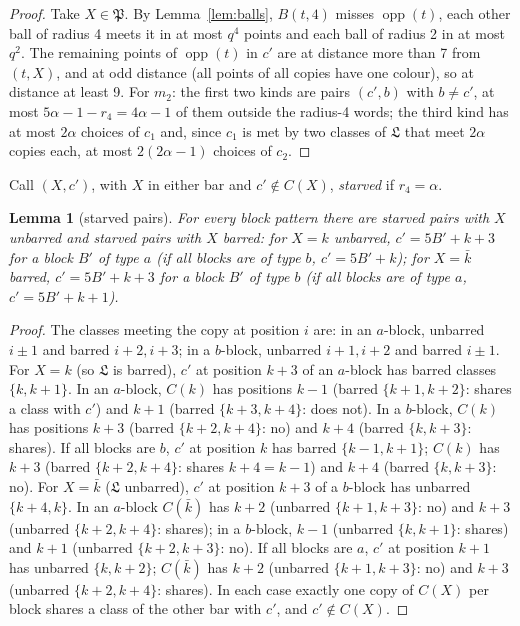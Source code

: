 \documentclass[11pt]{amsart}
\newtheorem{lemma}[theorem]{Lemma}
\theoremstyle{definition}
\theoremstyle{remark}
\numberwithin{equation}{section}
\newcommand{\opp}{\operatorname{opp}}
\begin{document}
\begin{proof}
Take $X\in\mathfrak P$. By Lemma~\ref{lem:balls}, $B(t,4)$ misses $\opp(t)$, each other ball of radius 4 meets it in at most
$q^4$ points and each ball of radius 2 in at most $q^2$. The remaining points of $\opp(t)$ in $c'$ are at distance more than 7
from $(t,X)$, and at odd distance (all points of all copies have one colour), so at distance at least 9. For $m_2$: the first
two kinds are pairs $(c',b)$ with $b\ne c'$, at most $5\alpha-1-r_4=4\alpha-1$ of them outside the radius-4 words; the third
kind has at most $2\alpha$ choices of $c_1$ and, since $c_1$ is met by two classes of $\mathfrak L$ that meet $2\alpha$ copies
each, at most $2(2\alpha-1)$ choices of $c_2$.
\end{proof}

Call $(X,c')$, with $X$ in either bar and $c'\notin C(X)$, \emph{starved} if $r_4=\alpha$.

\begin{lemma}[starved pairs]\label{lem:starved}
For every block pattern there are starved pairs with $X$ unbarred and starved pairs with $X$ barred: for $X=k$ unbarred,
$c'=5B'+k+3$ for a block $B'$ of type $a$ (if all blocks are of type $b$, $c'=5B'+k$); for $X=\bar k$ barred, $c'=5B'+k+3$ for
a block $B'$ of type $b$ (if all blocks are of type $a$, $c'=5B'+k+1$).
\end{lemma}

\begin{proof}
The classes meeting the copy at position $i$ are: in an $a$-block, unbarred $i\pm1$ and barred $i+2,i+3$; in a $b$-block,
unbarred $i+1,i+2$ and barred $i\pm1$. For $X=k$ (so $\mathfrak L$ is barred), $c'$ at position $k+3$ of an $a$-block has
barred classes $\{k,k+1\}$. In an $a$-block, $C(k)$ has positions $k-1$ (barred $\{k+1,k+2\}$: shares a class with $c'$) and
$k+1$ (barred $\{k+3,k+4\}$: does not). In a $b$-block, $C(k)$ has positions $k+3$ (barred $\{k+2,k+4\}$: no) and $k+4$
(barred $\{k,k+3\}$: shares). If all blocks are $b$, $c'$ at position $k$ has barred $\{k-1,k+1\}$; $C(k)$ has $k+3$ (barred
$\{k+2,k+4\}$: shares $k+4=k-1$) and $k+4$ (barred $\{k,k+3\}$: no). For $X=\bar k$ ($\mathfrak L$ unbarred), $c'$ at position
$k+3$ of a $b$-block has unbarred $\{k+4,k\}$. In an $a$-block $C(\bar k)$ has $k+2$ (unbarred $\{k+1,k+3\}$: no) and $k+3$
(unbarred $\{k+2,k+4\}$: shares); in a $b$-block, $k-1$ (unbarred $\{k,k+1\}$: shares) and $k+1$ (unbarred $\{k+2,k+3\}$: no).
If all blocks are $a$, $c'$ at position $k+1$ has unbarred $\{k,k+2\}$; $C(\bar k)$ has $k+2$ (unbarred $\{k+1,k+3\}$: no) and
$k+3$ (unbarred $\{k+2,k+4\}$: shares). In each case exactly one copy of $C(X)$ per block shares a class of the other bar with
$c'$, and $c'\notin C(X)$.
\end{proof}
\end{document}
